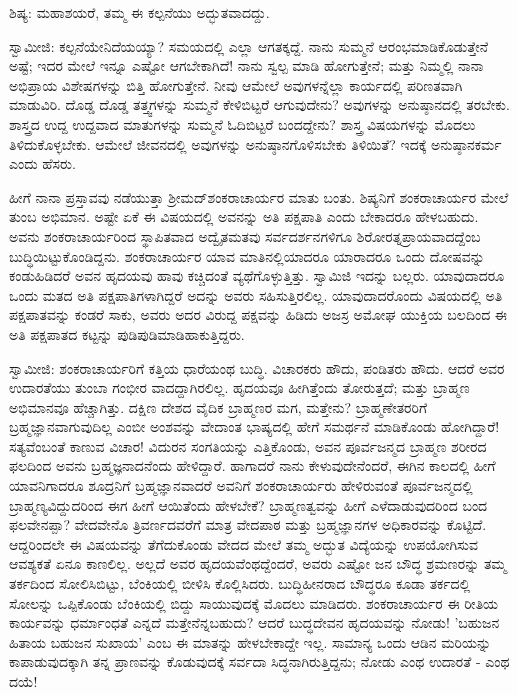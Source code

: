 ಶಿಷ್ಯ: ಮಹಾಶಯರೆ, ತಮ್ಮ ಈ ಕಲ್ಪನೆಯು ಅದ್ಭುತವಾದದ್ದು.

ಸ್ವಾಮೀಜಿ: ಕಲ್ಪನೆಯೇನಿದೆಯಯ್ಯಾ? ಸಮಯದಲ್ಲಿ ಎಲ್ಲಾ ಆಗತಕ್ಕದ್ದೆ. ನಾನು ಸುಮ್ಮನೆ ಆರಂಭಮಾಡಿಕೊಡುತ್ತೇನೆ ಅಷ್ಟೆ; ಇದರ ಮೇಲೆ ಇನ್ನೂ ಎಷ್ಟೋ ಆಗಬೇಕಾಗಿದೆ! ನಾನು ಸ್ವಲ್ಪ ಮಾಡಿ ಹೋಗುತ್ತೇನೆ; ಮತ್ತು ನಿಮ್ಮಲ್ಲಿ ನಾನಾ ಅಭಿಪ್ರಾಯ ವಿಶೇಷಗಳನ್ನು ಬಿತ್ತಿ ಹೋಗುತ್ತೇನೆ. ನೀವು ಆಮೇಲೆ ಅವುಗಳನ್ನೆಲ್ಲಾ ಕಾರ್ಯದಲ್ಲಿ ಪರಿಣತವಾಗಿ ಮಾಡುವಿರಿ. ದೊಡ್ಡ ದೊಡ್ಡ ತತ್ತ್ವಗಳನ್ನು ಸುಮ್ಮನೆ ಕೇಳಿಬಿಟ್ಟರೆ ಆಗುವುದೇನು? ಅವುಗಳನ್ನು ಅನುಷ್ಠಾನದಲ್ಲಿ ತರಬೇಕು. ಶಾಸ್ತ್ರದ ಉದ್ದ ಉದ್ದವಾದ ಮಾತುಗಳನ್ನು ಸುಮ್ಮನೆ ಓದಿಬಿಟ್ಟರೆ ಬಂದದ್ದೇನು? ಶಾಸ್ತ್ರ ವಿಷಯಗಳನ್ನು ಮೊದಲು ತಿಳಿದುಕೊಳ್ಳಬೇಕು. ಆಮೇಲೆ ಜೀವನದಲ್ಲಿ ಅವುಗಳನ್ನು ಅನುಷ್ಠಾನಗೊಳಿಸಬೇಕು ತಿಳಿಯಿತೆ? ಇದಕ್ಕೆ ಅನುಷ್ಠಾನಕರ್ಮ ಎಂದು ಹೆಸರು.

ಹೀಗೆ ನಾನಾ ಪ್ರಸ್ತಾವವು ನಡೆಯುತ್ತಾ ಶ‍್ರೀಮದ್‌ಶಂಕರಾಚಾರ್ಯರ ಮಾತು ಬಂತು. ಶಿಷ್ಯನಿಗೆ ಶಂಕರಾಚಾರ್ಯರ ಮೇಲೆ ತುಂಬ ಅಭಿಮಾನ. ಅಷ್ಟೇ ಏಕೆ ಈ ವಿಷಯದಲ್ಲಿ ಅವನನ್ನು ಅತಿ ಪಕ್ಷಪಾತಿ ಎಂದು ಬೇಕಾದರೂ ಹೇಳಬಹುದು. ಅವನು ಶಂಕರಾಚಾರ್ಯರಿಂದ ಸ್ಥಾಪಿತವಾದ ಅದ್ವೈತಮತವು ಸರ್ವದರ್ಶನಗಳಿಗೂ ಶಿರೋರತ್ನಪ್ರಾಯವಾದದ್ದೆಂಬ ಬುದ್ಧಿಯಿಟ್ಟುಕೊಂಡಿದ್ದನು. ಶಂಕರಾಚಾರ್ಯರ ಯಾವ ಮಾತಿನಲ್ಲಿಯಾದರೂ ಯಾರಾದರೂ ಒಂದು ದೋಷವನ್ನು ಕಂಡುಹಿಡಿದರೆ ಅವನ ಹೃದಯವು ಹಾವು ಕಚ್ಚಿದಂತೆ ವ್ಯಥೆಗೊಳ್ಳುತ್ತಿತ್ತು. ಸ್ವಾಮಿಜಿ ಇದನ್ನು ಬಲ್ಲರು. ಯಾವುದಾದರೂ ಒಂದು ಮತದ ಅತಿ ಪಕ್ಷಪಾತಿಗಳಾಗಿದ್ದರೆ ಅದನ್ನು ಅವರು ಸಹಿಸುತ್ತಿರಲಿಲ್ಲ. ಯಾವುದಾದರೊಂದು ವಿಷಯದಲ್ಲಿ ಅತಿ ಪಕ್ಷಪಾತವನ್ನು ಕಂಡರೆ ಸಾಕು, ಅವರು ಅದರ ವಿರುದ್ದ ಪಕ್ಷವನ್ನು ಹಿಡಿದು ಅಜಸ್ರ ಅಮೋಘ ಯುಕ್ತಿಯ ಬಲದಿಂದ ಈ ಅತಿ ಪಕ್ಷಪಾತದ ಕಟ್ಟನ್ನು ಪುಡಿಪುಡಿಮಾಡಿಹಾಕುತ್ತಿದ್ದರು.

ಸ್ವಾಮೀಜಿ: ಶಂಕರಾಚಾರ್ಯರಿಗೆ ಕತ್ತಿಯ ಧಾರೆಯಂಥ ಬುದ್ಧಿ. ವಿಚಾರಕರು ಹೌದು, ಪಂಡಿತರು ಹೌದು. ಆದರೆ ಅವರ ಉದಾರತೆಯು ತುಂಬಾ ಗಂಭೀರ ವಾದದ್ದಾಗಿರಲಿಲ್ಲ. ಹೃದಯವೂ ಹೀಗಿತ್ತೆಂದು ತೋರುತ್ತದೆ; ಮತ್ತು ಬ್ರಾಹ್ಮಣ ಅಭಿಮಾನವೂ ಹೆಚ್ಚಾಗಿತ್ತು. ದಕ್ಷಿಣ ದೇಶದ ವೈದಿಕ ಬ್ರಾಹ್ಮಣರ ಮಗ, ಮತ್ತೇನು? ಬ್ರಾಹ್ಮಣೇತರರಿಗೆ ಬ್ರಹ್ಮಜ್ಞಾನವಾಗುವುದಿಲ್ಲ ಎಂಬೀ ಅಂಶವನ್ನು ವೇದಾಂತ ಭಾಷ್ಯದಲ್ಲಿ ಹೇಗೆ ಸಮರ್ಥನೆ ಮಾಡಿಕೊಂಡು ಹೋಗಿದ್ದಾರೆ! ಸತ್ಯವೆಂಬಂತೆ ಕಾಣುವ ವಿಚಾರ! ವಿದುರನ ಸಂಗತಿಯನ್ನು ಎತ್ತಿಕೊಂಡು, ಅವನ ಪೂರ್ವಜನ್ಮದ ಬ್ರಾಹ್ಮಣ ಶರೀರದ ಫಲದಿಂದ ಅವನು ಬ್ರಹ್ಮಜ್ಞನಾದನೆಂದು ಹೇಳಿದ್ದಾರೆ. ಹಾಗಾದರೆ ನಾನು ಕೇಳುವುದೇನೆಂದರೆ, ಈಗಿನ ಕಾಲದಲ್ಲಿ ಹೀಗೆ ಯಾವನಿಗಾದರೂ ಶೂದ್ರನಿಗೆ ಬ್ರಹ್ಮಜ್ಞಾನವಾದರೆ ಅವನಿಗೆ ಶಂಕರಾಚಾರ್ಯರು ಹೇಳಿರುವಂತೆ ಪೂರ್ವಜನ್ಮದಲ್ಲಿ ಬ್ರಾಹ್ಮಣ್ಯವಿದ್ದುದರಿಂದ ಈಗ ಹೀಗೆ ಆಯಿತೆಂದು ಹೇಳಬೇಕೆ? ಬ್ರಾಹ್ಮಣತ್ವವನ್ನು ಹೀಗೆ ಎಳೆದಾಡುವುದರಿಂದ ಬಂದ ಫಲವೇನಪ್ಪಾ? ವೇದವೇನೊ ತ್ರಿವರ್ಣದವರೆಗೆ ಮಾತ್ರ ವೇದಪಾಠ ಮತ್ತು ಬ್ರಹ್ಮಜ್ಞಾನಗಳ ಅಧಿಕಾರವನ್ನು ಕೊಟ್ಟಿದೆ. ಆದ್ದರಿಂದಲೇ ಈ ವಿಷಯವನ್ನು ತೆಗೆದುಕೊಂಡು ವೇದದ ಮೇಲೆ ತಮ್ಮ ಅದ್ಭುತ ವಿದ್ಯೆಯನ್ನು ಉಪಯೋಗಿಸುವ ಆವಶ್ಯಕತೆ ಏನೂ ಕಾಣಲಿಲ್ಲ. ಅಲ್ಲದೆ ಅವರ ಹೃದಯವೆಂಥದ್ದೆಂದರೆ, ಅವರು ಎಷ್ಟೋ ಜನ ಬೌದ್ಧ ಶ್ರಮಣರನ್ನು ತಮ್ಮ ತರ್ಕದಿಂದ ಸೋಲಿಸಿಬಿಟ್ಟು, ಬೆಂಕಿಯಲ್ಲಿ ಬೀಳಿಸಿ ಕೊಲ್ಲಿಸಿದರು. ಬುದ್ಧಿಹೀನರಾದ ಬೌದ್ಧರೂ ಕೂಡಾ ತರ್ಕದಲ್ಲಿ ಸೋಲನ್ನು ಒಪ್ಪಿಕೊಂಡು ಬೆಂಕಿಯಲ್ಲಿ ಬಿದ್ದು ಸಾಯುವುದಕ್ಕೆ ಮೊದಲು ಮಾಡಿದರು. ಶಂಕರಾಚಾರ್ಯರ ಈ ರೀತಿಯ ಕಾರ್ಯವನ್ನು ಧರ್ಮಾಂಧತೆ ಎನ್ನದೆ ಮತ್ತೇನೆನ್ನಬಹುದು? ಆದರೆ ಬುದ್ಧದೇವನ ಹೃದಯವನ್ನು ನೋಡು! 'ಬಹುಜನ ಹಿತಾಯ ಬಹುಜನ ಸುಖಾಯ' ಎಂಬ ಈ ಮಾತನ್ನು ಹೇಳಬೇಕಾದ್ದೇ ಇಲ್ಲ. ಸಾಮಾನ್ಯ ಒಂದು ಆಡಿನ ಮರಿಯನ್ನು ಕಾಪಾಡುವುದಕ್ಕಾಗಿ ತನ್ನ ಪ್ರಾಣವನ್ನು ಕೊಡುವುದಕ್ಕೆ ಸರ್ವದಾ ಸಿದ್ಧನಾಗಿರುತ್ತಿದ್ದನು; ನೋಡು ಎಂಥ ಉದಾರತೆ - ಎಂಥ ದಯೆ!

